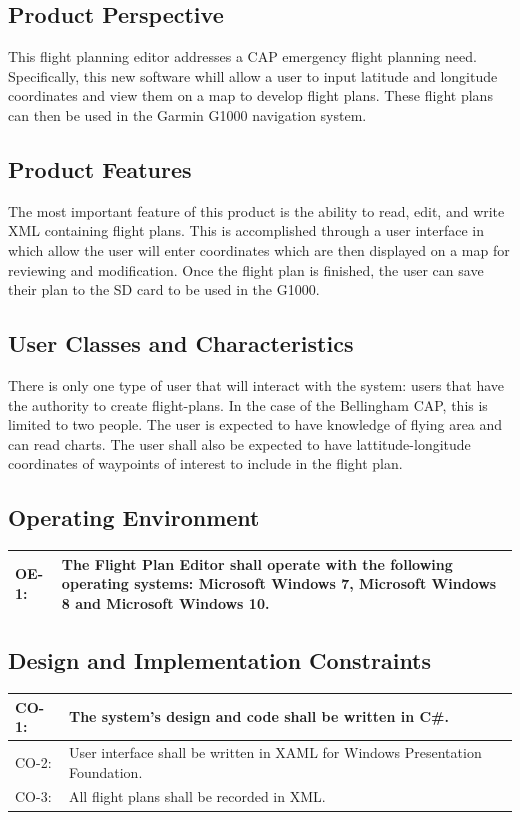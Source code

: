 \documentclass[12pt, letterpaper]{article}
\begin{document}
  \subsection{Product Perspective}
    This flight planning editor addresses a CAP emergency flight planning need.
    Specifically, this new software whill allow a user to input latitude and longitude coordinates 
    and view them on a map to develop flight plans.
    These flight plans can then be used in the Garmin G1000 navigation system.
  \subsection{Product Features}
    The most important feature of this product is the ability to read, edit, and write XML containing flight plans.
    This is accomplished through a user interface in which allow the user will enter coordinates which are then
    displayed on a map for reviewing and modification.
    Once the flight plan is finished, the user can save their plan to the SD card to be used in the G1000.
  \subsection{User Classes and Characteristics}
    There is only one type of user that will interact with the system: 
    users that have the authority to create flight-plans.
    In the case of the Bellingham CAP, this is limited to two people.
    The user is expected to have knowledge of flying area and can read charts.
    The user shall also be expected to have lattitude-longitude coordinates of
    waypoints of interest to include in the flight plan.
  \subsection{Operating Environment}
    \begin{tabularx}{\textwidth}{|l|X|} \hline
      OE-1: & The Flight Plan Editor shall operate with the following operating systems:
              Microsoft Windows 7, Microsoft Windows 8 and Microsoft Windows 10. \\ \hline
    \end{tabularx}
  \subsection{Design and Implementation Constraints}
    \begin{tabularx}{\textwidth}{|l|X|} \hline
      CO-1: & The system's design and code shall be written in C\#. \\ \hline
      CO-2: & User interface shall be written in XAML for Windows Presentation Foundation.\\ \hline
      CO-3: & All flight plans shall be recorded in XML. \\ \hline
    \end{tabularx}
\end{document}
